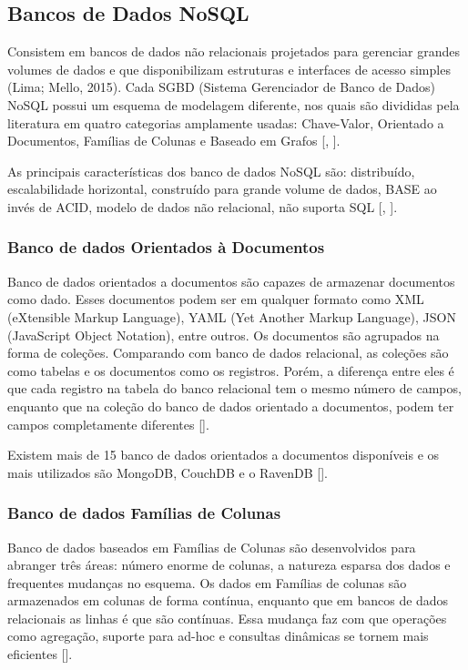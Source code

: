 \subsection{Bancos de Dados NoSQL}

Consistem em bancos de dados não relacionais projetados para gerenciar grandes volumes de dados e que disponibilizam estruturas e interfaces de acesso simples (Lima; Mello, 2015). Cada SGBD (Sistema Gerenciador de Banco de Dados) NoSQL possui um esquema de modelagem diferente, nos quais são divididas pela literatura em quatro categorias amplamente usadas: Chave-Valor, Orientado a Documentos, Famílias de Colunas e Baseado em Grafos [\cite{fowler:2013}, \cite{kaur:2013}].

As principais características dos banco de dados NoSQL são: distribuído, escalabilidade horizontal, construído para grande volume de dados, BASE ao invés de ACID, modelo de dados não relacional, não suporta SQL [\cite{fowler:2013}, \cite{nasholm:2012}].

\subsubsection{Banco de dados Orientados à Documentos}

Banco de dados orientados a documentos são capazes de armazenar documentos como dado. Esses documentos podem ser em qualquer formato como XML (eXtensible Markup Language), YAML (Yet Another Markup Language), JSON (JavaScript Object Notation), entre outros. Os documentos são agrupados na forma de coleções. Comparando com banco de dados relacional, as coleções são como tabelas e os documentos como os registros. Porém, a diferença entre eles é que cada registro na tabela do banco relacional tem o mesmo número de campos, enquanto que na coleção do banco de dados orientado a documentos, podem ter campos completamente diferentes [\cite{kaur:2013}].

Existem mais de 15 banco de dados orientados a documentos disponíveis e os mais utilizados são MongoDB, CouchDB e o RavenDB [\cite{kaur:2013}].

\subsubsection{Banco de dados Famílias de Colunas}

Banco de dados baseados em Famílias de Colunas são desenvolvidos para abranger três áreas: número enorme de colunas, a natureza esparsa dos dados e frequentes mudanças no esquema. Os dados em Famílias de colunas são armazenados em colunas de forma contínua, enquanto que em bancos de dados relacionais as linhas é que são contínuas. Essa mudança faz com que operações como agregação, suporte para ad-hoc e consultas dinâmicas se tornem mais eficientes [\cite{kaur:2013}].

